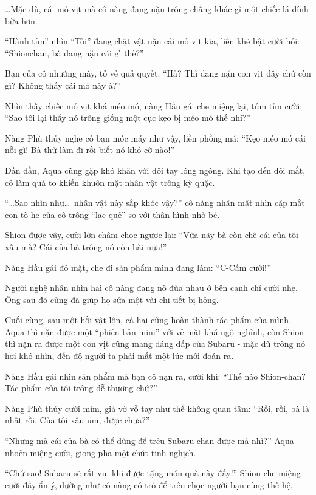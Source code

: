 \documentclass[../main.tex]{subfiles}
\begin{document}
\dots Mặc dù, cái mỏ vịt mà cô nàng đang nặn trông chẳng khác gì một chiếc lá dính bừa hơn.

``Hành tím'' nhìn ``Tỏi'' đang chật vật nặn cái mỏ vịt kia, liền khẽ bật cười hỏi: ``Shionchan, bà đang nặn cái gì thế?''

Bạn của cô nhướng mày, tỏ vẻ quả quyết: ``Hả? Thì đang nặn con vịt đây chứ còn gì? Không thấy cái mỏ này à?''

Nhìn thấy chiếc mỏ vịt khá méo mó, nàng Hầu gái che miệng lại, tủm tỉm cười: ``Sao tôi lại thấy nó trông giống một cục kẹo bị méo mó thế nhỉ?''

Nàng Phù thủy nghe cô bạn móc máy như vậy, liền phồng má: ``Kẹo méo mó cái nỗi gì! Bà thử làm đi rồi biết nó khó cỡ nào!''

\ct

Dần dần, Aqua cũng gặp khó khăn với đôi tay lóng ngóng. Khi tạo đến đôi mắt, cô làm quá to khiến khuôn mặt nhân vật trông kỳ quặc.

``\dots Sao nhìn như\dots\ nhân vật này sắp khóc vậy?'' cô nàng nhăn mặt nhìn cặp mắt con tò he của cô trông ``lạc quẻ'' so với thân hình nhỏ bé.

Shion được vậy, cười lớn châm chọc ngược lại: ``Vừa nãy bà còn chê cái của tôi xấu mà? Cái của bà trông nó còn hài nữa!''

Nàng Hầu gái đỏ mặt, che đi sản phẩm mình đang làm: ``C-Cấm cười!''

Người nghệ nhân nhìn hai cô nàng đang nô đùa nhau ở bên cạnh chỉ cười nhẹ. Ông sau đó cũng đã giúp họ sửa một vài chi tiết bị hỏng.

Cuối cùng, sau một hồi vật lộn, cả hai cũng hoàn thành tác phẩm của mình. Aqua thì nặn được một ``phiên bản mini'' với vẻ mặt khá ngộ nghĩnh, còn Shion thì nặn ra được một con vịt cũng mang dáng dấp của Subaru - mặc dù trông nó hơi khó nhìn, đến độ người ta phải mất một lúc mới đoán ra.

Nàng Hầu gái nhìn sản phẩm mà bạn cô nặn ra, cười khì: ``Thế nào Shion-chan? Tác phẩm của tôi trông dễ thương chứ?''

Nàng Phù thủy cười mỉm, giả vờ vỗ tay như thể không quan tâm: ``Rồi, rồi, bà là nhất rồi. Của tôi xấu um, được chưa?''

``Nhưng mà cái của bà có thể dùng để trêu Subaru-chan được mà nhỉ?'' Aqua nhoẻn miệng cười, giọng pha một chút tinh nghịch.

``Chứ sao! Subaru sẽ rất vui khi được tặng món quà này đấy!'' Shion che miệng cười đầy ẩn ý, dường như cô nàng có trò để trêu chọc người bạn cùng thế hệ.
\end{document}
